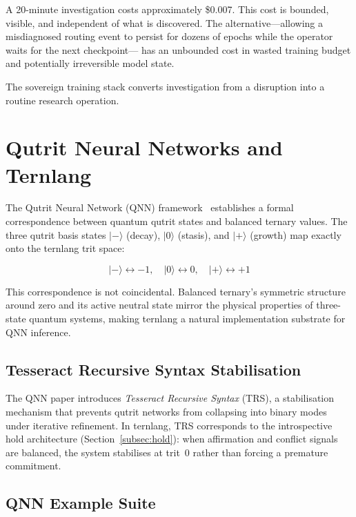 \documentclass[11pt,a4paper]{article}
\begin{document}
A 20-minute investigation costs approximately \$0.007. This cost is bounded, visible,
and independent of what is discovered. The alternative---allowing a misdiagnosed routing
event to persist for dozens of epochs while the operator waits for the next checkpoint---
has an unbounded cost in wasted training budget and potentially irreversible model state.

The sovereign training stack converts investigation from a disruption into a routine
research operation.

\section{Qutrit Neural Networks and Ternlang}
\label{sec:qnn}

The Qutrit Neural Network (QNN) framework~\cite{kepp2026qnn} establishes a
formal correspondence between quantum qutrit states and balanced ternary values.
The three qutrit basis states $\lvert -\rangle$ (decay), $\lvert 0\rangle$
(stasis), and $\lvert +\rangle$ (growth) map exactly onto the ternlang trit
space:

\begin{equation}
  \lvert -\rangle \leftrightarrow -1, \quad
  \lvert 0\rangle \leftrightarrow 0,  \quad
  \lvert +\rangle \leftrightarrow +1
  \label{eq:qnn_map}
\end{equation}

This correspondence is not coincidental. Balanced ternary's symmetric
structure around zero and its active neutral state mirror the physical
properties of three-state quantum systems, making ternlang a natural
implementation substrate for QNN inference.

\subsection{Tesseract Recursive Syntax Stabilisation}

The QNN paper introduces \emph{Tesseract Recursive Syntax} (TRS), a
stabilisation mechanism that prevents qutrit networks from collapsing
into binary modes under iterative refinement. In ternlang, TRS corresponds
to the introspective hold architecture (Section~\ref{subsec:hold}): when
affirmation and conflict signals are balanced, the system stabilises at
trit~$0$ rather than forcing a premature commitment.

\subsection{QNN Example Suite}
\end{document}
